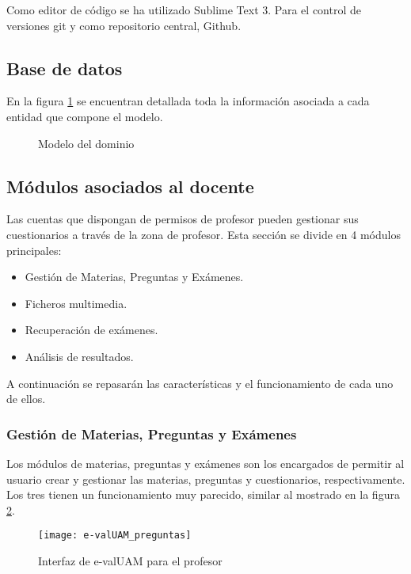 Como editor de código se ha utilizado Sublime Text 3. Para el control de versiones git y como repositorio central, Github.


\subsection{Base de datos}

En la figura \ref{fig:base de datos} se encuentran detallada toda la información asociada a cada entidad que compone el modelo.

\begin{figure}[htp!]
	\centering
	\caption{Modelo del dominio}
	\label{fig:base de datos}
\end{figure}


\subsection{Módulos asociados al docente}

Las cuentas que dispongan de permisos de profesor pueden gestionar sus cuestionarios a través de la zona de profesor. Esta sección se divide en 4 módulos principales:

\begin{itemize}
	\item Gestión de Materias, Preguntas y Exámenes.
	\item Ficheros multimedia.
	\item Recuperación de exámenes.
	\item Análisis de resultados.
\end{itemize}

A continuación se repasarán las características y el funcionamiento de cada uno de ellos.

\subsubsection{Gestión de Materias, Preguntas y Exámenes}

Los módulos de materias, preguntas y exámenes son los encargados de permitir al usuario crear y gestionar las materias, preguntas y cuestionarios, respectivamente. Los tres tienen un funcionamiento muy parecido, similar al mostrado en la figura \ref{fig:e-valUAM interfaz profesor}.

\begin{figure}[htp!]
	\centering
	\texttt{[image: e-valUAM\_preguntas]}
	\caption{Interfaz de e-valUAM para el profesor}
	\label{fig:e-valUAM interfaz profesor}
\end{figure}

